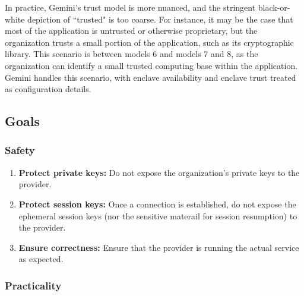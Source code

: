 
In practice, Gemini's trust model is more nuanced, and the stringent
black-or-white depiction of ``trusted" is too coarse.
%
For instance, it may be the case that most of the application is untrusted or
otherwise proprietary, but the organization trusts a small portion of the
application, such as its cryptographic library.
%
This scenario is between models 6 and models 7 and 8, as the organization can
identify a small trusted computing base within the application.
%
Gemini handles this scenario, with enclave availability and enclave trust
treated as configuration details.


\subsection{Goals}

\subsubsection{Safety}

\begin{enumerate}
    \item \textbf{Protect private keys:}
        Do not expose the organization's private keys to the provider.
    
    \item \textbf{Protect session keys:}
        Once a connection is established, do not expose the ephemeral session keys (nor
        the sensitive materail for session resumption) to the provider.


    \item \textbf{Ensure correctness:}
    Ensure that the provider is running the actual service as expected.
\end{enumerate}


\subsubsection{Practicality}

